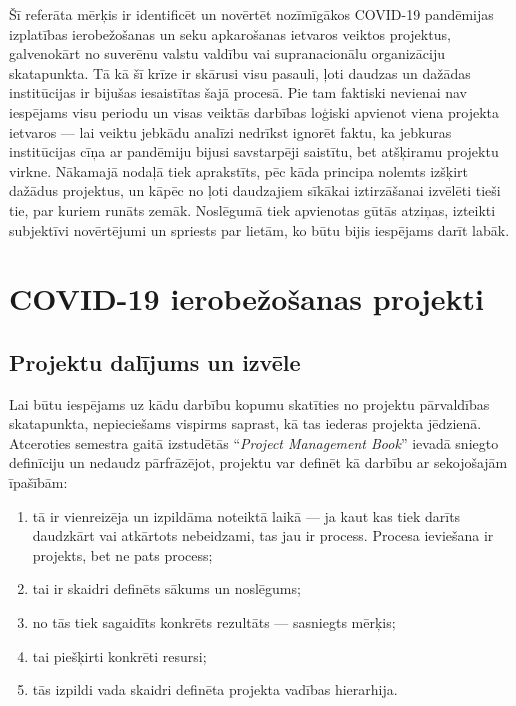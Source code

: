 \documentclass[12pt, a4paper]{article}
\numberwithin{equation}{section} %
\begin{document}
Šī referāta mērķis ir identificēt un novērtēt nozīmīgākos COVID-19 pandēmijas izplatības ierobežošanas un seku apkarošanas ietvaros veiktos projektus, galvenokārt no suverēnu valstu valdību vai supranacionālu organizāciju skatapunkta. Tā kā šī krīze ir skārusi visu pasauli, ļoti daudzas un dažādas institūcijas ir bijušas iesaistītas šajā procesā. Pie tam faktiski nevienai nav iespējams visu periodu un visas veiktās darbības loģiski apvienot viena projekta ietvaros --- lai veiktu jebkādu analīzi nedrīkst ignorēt faktu, ka jebkuras institūcijas cīņa ar pandēmiju bijusi savstarpēji saistītu, bet atšķiramu projektu virkne. Nākamajā nodaļā tiek aprakstīts, pēc kāda principa nolemts izšķirt dažādus projektus, un kāpēc no ļoti daudzajiem sīkākai iztirzāšanai izvēlēti tieši tie, par kuriem runāts zemāk. Noslēgumā tiek apvienotas gūtās atziņas, izteikti subjektīvi novērtējumi un spriests par lietām, ko būtu bijis iespējams darīt labāk.

\newpage
\section{COVID-19 ierobežošanas projekti}

\subsection{Projektu dalījums un izvēle}

Lai būtu iespējams uz kādu darbību kopumu skatīties no projektu pārvaldības skatapunkta, nepieciešams vispirms saprast, kā tas iederas projekta jēdzienā. Atceroties semestra gaitā izstudētās ``\textit{Project Management Book}'' ievadā sniegto definīciju \cite{proj_book_intro} un nedaudz pārfrāzējot, projektu var definēt kā darbību ar sekojošajām īpašībām:

\begin{enumerate}
    \item tā ir vienreizēja un izpildāma noteiktā laikā --- ja kaut kas tiek darīts daudzkārt vai atkārtots nebeidzami, tas jau ir process. Procesa ieviešana ir projekts, bet ne pats process;
    \item tai ir skaidri definēts sākums un noslēgums;
    \item no tās tiek sagaidīts konkrēts rezultāts --- sasniegts mērķis;
    \item tai piešķirti konkrēti resursi;
    \item tās izpildi vada skaidri definēta projekta vadības hierarhija. 
\end{enumerate}
\end{document}
